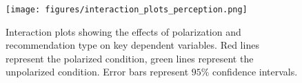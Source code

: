 \begin{figure}[h!]
    \centering
    \texttt{[image: figures/interaction\_plots\_perception.png]}
    \caption{Interaction plots showing the effects of polarization and recommendation type on key dependent variables. Red lines represent the polarized condition, green lines represent the unpolarized condition. Error bars represent $95\%$ confidence intervals.}
    \label{fig:perception-interaction-plots}
\end{figure}

